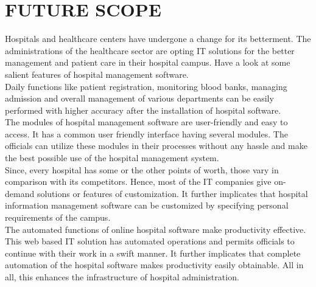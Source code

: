 \documentclass[a4paper, 14pt]{report}
\begin{document}
{\newpage

\chapter{FUTURE SCOPE}
Hospitals and healthcare centers have undergone a change for its betterment. The administrations of the healthcare sector are opting IT solutions for the better management and patient care in their hospital campus. Have a look at some salient features of hospital management software.\\
Daily functions like patient registration, monitoring blood banks, managing admission and overall management of various departments can be easily performed with higher accuracy after the installation of hospital software.\\
The modules of hospital management software are user-friendly and easy to access. It has a common user friendly interface having several modules. The officials can utilize these modules in their processes without any hassle and make the best possible use of the hospital management system.\\
Since, every hospital has some or the other points of worth, those vary in comparison with its competitors. Hence, most of the IT companies give on-demand solutions or features of customization. It further implicates that hospital information management software can be customized by specifying personal requirements of the campus.\\
The automated functions of online hospital software make productivity effective. This web based IT solution has automated operations and permits officials to continue with their work in a swift manner. It further implicates that complete automation of the hospital software makes productivity easily obtainable. All in all, this enhances the infrastructure of hospital administration.


}
\end{document}
